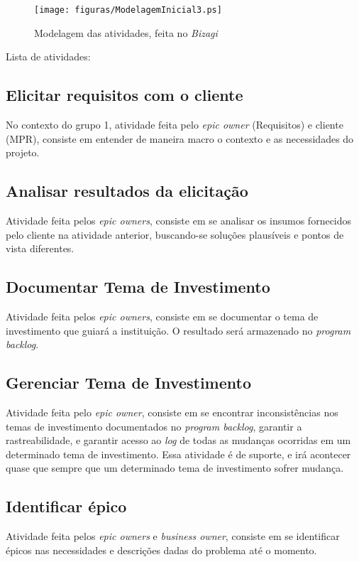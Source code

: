 \begin{figure}[h]
  \centering
  \caption{Modelagem das atividades, feita no \emph{Bizagi}}
  \texttt{[image: figuras/ModelagemInicial3.ps]}
\end{figure}

Lista de atividades:
\subsection{Elicitar requisitos com o cliente}
No contexto do grupo 1, atividade feita pelo \emph{epic owner} (Requisitos) e cliente (MPR), consiste em entender de maneira macro o contexto e as necessidades do projeto.

\subsection{Analisar resultados da elicitação}
Atividade feita pelos \emph{epic owners}, consiste em se analisar os insumos fornecidos pelo cliente na atividade anterior, buscando-se soluções plausíveis e pontos de vista diferentes.

\subsection{Documentar Tema de Investimento}
Atividade feita pelos \emph{epic owners}, consiste em se documentar o tema de investimento que guiará a instituição. O resultado será armazenado no \emph{program backlog}.

\subsection{Gerenciar Tema de Investimento}
Atividade feita pelo \emph{epic owner}, consiste em se encontrar inconsistências nos temas de investimento documentados no \emph{program backlog}, garantir a rastreabilidade, e garantir acesso ao \emph{log} de todas as mudanças ocorridas em um determinado tema de investimento. Essa atividade é de suporte, e irá acontecer quase que sempre que um determinado tema de investimento sofrer mudança.

\subsection{Identificar épico}
Atividade feita pelos \emph{epic owners} e \emph{business owner}, consiste em se identificar épicos nas necessidades e descrições dadas do problema até o momento.


